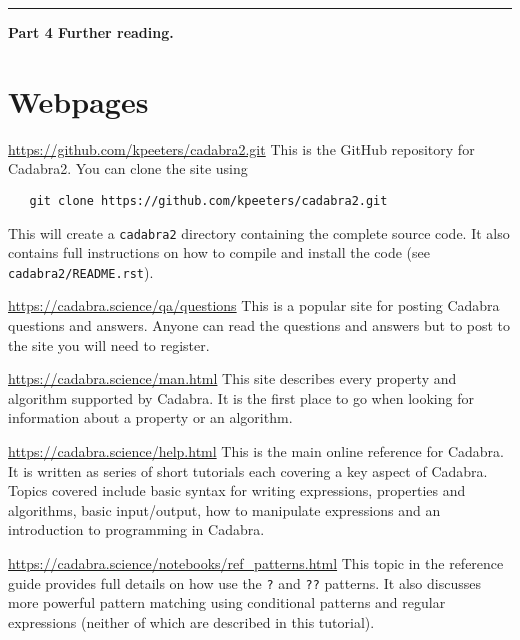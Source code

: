 \documentclass[a4paper,12pt]{article}
\numberwithin{equation}{section}%
\begin{document}
\egroup

\clearpage

\hrule height 0pt
\vskip 4cm
{\Huge\bf Part 4 Further reading.}
\vskip 2cm

\lstset{numbers=none}

\clearpage

\section*{Webpages}

\url{https://github.com/kpeeters/cadabra2.git}\Break
This is the GitHub repository for Cadabra2. You can clone the site using
\begin{lstlisting}
   git clone https://github.com/kpeeters/cadabra2.git
\end{lstlisting}
This will create a \verb|cadabra2| directory containing the complete source code. It also
contains full instructions on how to compile and install the code (see
\verb|cadabra2/README.rst|).

\url{https://cadabra.science/qa/questions}\Break
This is a popular site for posting Cadabra questions and answers. Anyone can read the
questions and answers but to post to the site you will need to register.

\url{https://cadabra.science/man.html}\Break
This site describes every property and algorithm supported by Cadabra. It is the
first place to go when looking for information about a property or an algorithm.

\url{https://cadabra.science/help.html}\Break
This is the main online reference for Cadabra. It is written as series of short tutorials
each covering a key aspect of Cadabra. Topics covered include basic syntax for writing
expressions, properties and algorithms, basic input/output, how to manipulate expressions and
an introduction to programming in Cadabra.

\url{https://cadabra.science/notebooks/ref_patterns.html}\Break
This topic in the reference guide provides full details on how use the \verb|?| and
\verb|??| patterns. It also discusses more powerful pattern matching using conditional
patterns and regular expressions (neither of which are described in this tutorial).
\end{document}
